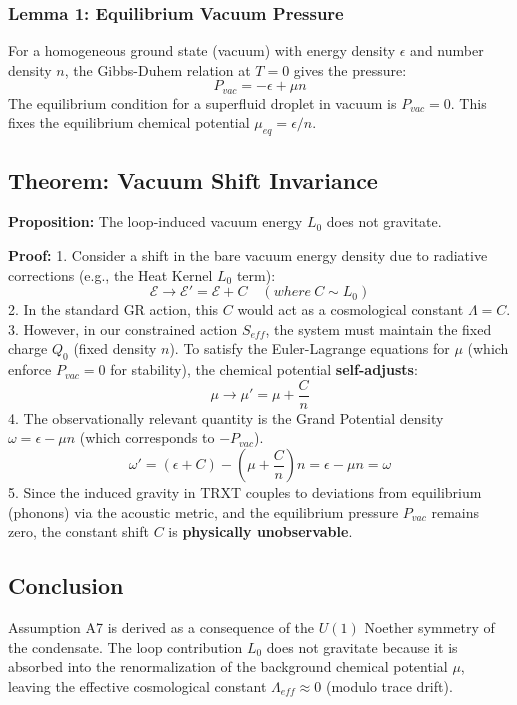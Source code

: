 \documentclass[a4paper,12pt]{article}
\begin{document}
\subsubsection{Lemma 1: Equilibrium Vacuum Pressure}
For a homogeneous ground state (vacuum) with energy density $\epsilon$ and number density $n$, the Gibbs-Duhem relation at $T=0$ gives the pressure:
\begin{equation}
    P_{vac} = -\epsilon + \mu n
\end{equation}
The equilibrium condition for a superfluid droplet in vacuum is $P_{vac} = 0$. This fixes the equilibrium chemical potential $\mu_{eq} = \epsilon/n$.

\subsection{Theorem: Vacuum Shift Invariance}

\textbf{Proposition:} The loop-induced vacuum energy $L_0$ does not gravitate.

\textbf{Proof:}
1.  Consider a shift in the bare vacuum energy density due to radiative corrections (e.g., the Heat Kernel $L_0$ term):
    \begin{equation}
        \mathcal{E} \to \mathcal{E}' = \mathcal{E} + C \quad (where \ C \sim L_0)
    \end{equation}
2.  In the standard GR action, this $C$ would act as a cosmological constant $\Lambda = C$.
3.  However, in our constrained action $S_{eff}$, the system must maintain the fixed charge $Q_0$ (fixed density $n$). To satisfy the Euler-Lagrange equations for $\mu$ (which enforce $P_{vac}=0$ for stability), the chemical potential \textbf{self-adjusts}:
    \begin{equation}
        \mu \to \mu' = \mu + \frac{C}{n}
    \end{equation}
4.  The observationally relevant quantity is the Grand Potential density $\omega = \epsilon - \mu n$ (which corresponds to $-P_{vac}$).
    \begin{equation}
        \omega' = (\epsilon + C) - \left(\mu + \frac{C}{n}\right)n = \epsilon - \mu n = \omega
    \end{equation}
5.  Since the induced gravity in TRXT couples to deviations from equilibrium (phonons) via the acoustic metric, and the equilibrium pressure $P_{vac}$ remains zero, the constant shift $C$ is \textbf{physically unobservable}.

\subsection{Conclusion}
Assumption A7 is derived as a consequence of the $U(1)$ Noether symmetry of the condensate. The loop contribution $L_0$ does not gravitate because it is absorbed into the renormalization of the background chemical potential $\mu$, leaving the effective cosmological constant $\Lambda_{eff} \approx 0$ (modulo trace drift).
\end{document}
